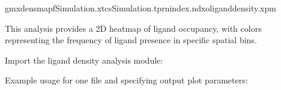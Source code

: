 \documentclass[a4paper,10pt,english]{sphinxmanual}
\begin{document}
\begin{sphinxVerbatim}[commandchars=\\\{\}]
gmxdensmap\PYGZhy{}fSimulation.xtc\PYGZhy{}sSimulation.tpr\PYGZhy{}nindex.ndx\PYGZhy{}oligand\PYGZus{}density.xpm
\end{sphinxVerbatim}

\sphinxAtStartPar
This analysis provides a 2D heatmap of ligand occupancy, with colors representing the frequency of ligand presence in specific spatial bins.

\sphinxAtStartPar
{}

\sphinxAtStartPar
Import the ligand density analysis module:

\begin{sphinxVerbatim}[commandchars=\\\{\}]
 
\end{sphinxVerbatim}

\sphinxAtStartPar
Example usage for one  file and specifying output plot parameters:
\end{document}
